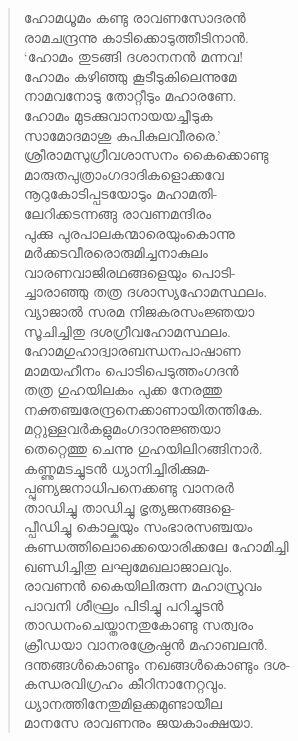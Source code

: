 \begin{verse}
ഹോമധൂമം കണ്ടു രാവണസോദരന്‍\\
രാമചന്ദ്രന്നു കാടിക്കൊടുത്തീടിനാന്‍.\\
‘ഹോമം തുടങ്ങി ദശാനനന്‍ മന്നവ!\\
ഹോമം കഴിഞ്ഞു കൂടീടുകിലെന്നുമേ\\
നാമവനോടു തോറ്റീടും മഹാരണേ.\\
ഹോമം മുടക്കുവാനായയച്ചീടുക\\
സാമോദമാശു കപികുലവീരരെ.’\\
ശ്രീരാമസുഗ്രീവശാസനം കൈക്കൊണ്ടു\\
മാരുതപുത്രാംഗദാദികളൊക്കവേ\\
നൂറുകോടിപ്പടയോടും മഹാമതി-\\
ലേറിക്കടന്നങ്ങു രാവണമന്ദിരം\\
പുക്കു പുരപാലകന്മാരെയുംകൊന്നു\\
മര്‍ക്കടവീരരൊരുമിച്ചനാകുലം\\
വാരണവാജിരഥങ്ങളെയും പൊടി-\\
ച്ചാരാഞ്ഞു തത്ര ദശാസ്യഹോമസ്ഥലം.\\
വ്യാജാല്‍ സരമ നിജകരസംജ്ഞയാ\\
സൂചിച്ചിതു ദശഗ്രീവഹോമസ്ഥലം.\\
ഹോമഗുഹാദ്വാരബന്ധനപാഷാണ\\
മാമയഹീനം പൊടിപെടുത്തംഗദന്‍\\
തത്ര ഗുഹയിലകം പുക്ക നേരത്തു\\
നക്തഞ്ചരേന്ദ്രനെക്കാണായിതന്തികേ.\\
മറ്റുള്ളവര്‍കളുമംഗദാനുജ്ഞയാ\\
തെറ്റെത്തു ചെന്നു ഗുഹയിലിറങ്ങിനാര്‍.\\
കണ്ണുമടച്ചുടന്‍ ധ്യാനിച്ചിരിക്കുമ-\\
പ്പുണ്യജനാധിപനെക്കണ്ടു വാനരര്‍\\
താഡിച്ചു താഡിച്ചു ഭൃത്യജനങ്ങളെ-\\
പ്പീഡിച്ചു കൊല്കയും സംഭാരസഞ്ചയം\\
കുണ്ഡത്തിലൊക്കെയൊരിക്കലേ ഹോമിച്ചി\\
ഖണ്ഡിച്ചിതു ലഘുമേഖലാജാലവും.\\
രാവണന്‍ കൈയിലിരുന്ന മഹാസ്രുവം\\
പാവനി ശീഘ്രം പിടിച്ചു പറിച്ചുടന്‍\\
താഡനംചെയ്താനതുകോണ്ടു സത്വരം\\
ക്രീഡയാ വാനരശ്രേഷ്ഠന്‍ മഹാബലന്‍.\\
ദന്തങ്ങള്‍കൊണ്ടും നഖങ്ങള്‍കൊണ്ടും ദശ-\\
കന്ധരവിഗ്രഹം കീറിനാനേറ്റവും.\\
ധ്യാനത്തിനേതുമിളക്കമുണ്ടായീല\\
മാനസേ രാവണനും ജയകാംക്ഷയാ.\\

\end{verse}
